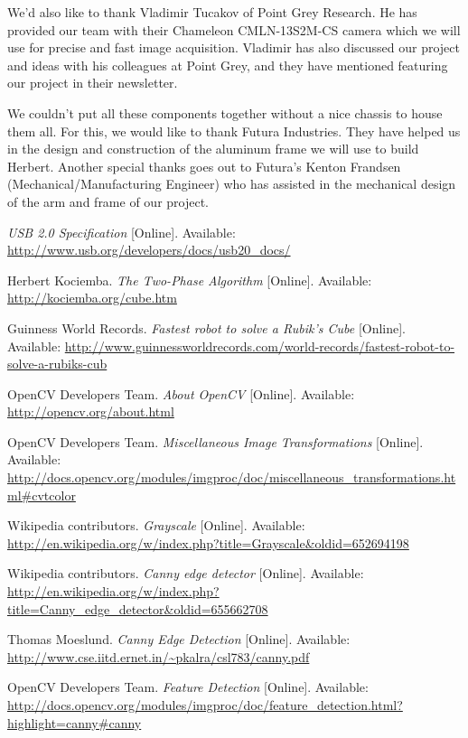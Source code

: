 \documentclass[final, letterpaper, 10 pt, conference, onecolumn]{IEEEtran}
\begin{document}
We'd also like to thank Vladimir Tucakov of Point Grey Research. He has provided our team with their Chameleon CMLN-13S2M-CS camera which we will use for precise and fast image acquisition. Vladimir has also discussed our project and ideas with his colleagues at Point Grey, and they have mentioned featuring our project in their newsletter.

We couldn't put all these components together without a nice chassis to house them all. For this, we would like to thank Futura Industries. They have helped us in the design and construction of the aluminum frame we will use to build Herbert. Another special thanks goes out to Futura's Kenton Frandsen (Mechanical/Manufacturing Engineer) who has assisted in the mechanical design of the arm and frame of our project.


\begin{thebibliography}{9}


\emph{USB 2.0 Specification}
[Online]. Available: \url{http://www.usb.org/developers/docs/usb20_docs/}

Herbert Kociemba.
\emph{The Two-Phase Algorithm}
[Online]. Available: \url{http://kociemba.org/cube.htm}

Guinness World Records.
\emph{Fastest robot to solve a Rubik's Cube}
[Online]. Available: \url{http://www.guinnessworldrecords.com/world-records/fastest-robot-to-solve-a-rubiks-cub}

OpenCV Developers Team.
\emph{About OpenCV}
[Online]. Available: \url{http://opencv.org/about.html}

OpenCV Developers Team.
\emph{Miscellaneous Image Transformations}
[Online]. Available: \url{http://docs.opencv.org/modules/imgproc/doc/miscellaneous_transformations.html#cvtcolor}

Wikipedia contributors.
\emph{Grayscale}
[Online]. Available: \url{http://en.wikipedia.org/w/index.php?title=Grayscale&oldid=652694198}

Wikipedia contributors.
\emph{Canny edge detector}
[Online]. Available: \url{http://en.wikipedia.org/w/index.php?title=Canny_edge_detector&oldid=655662708}

Thomas Moeslund.
\emph{Canny Edge Detection}
[Online]. Available: \url{http://www.cse.iitd.ernet.in/~pkalra/csl783/canny.pdf}

OpenCV Developers Team.
\emph{Feature Detection}
[Online]. Available: \url{http://docs.opencv.org/modules/imgproc/doc/feature_detection.html?highlight=canny#canny}


\end{thebibliography}
\end{document}
